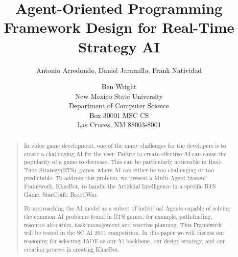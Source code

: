 \documentclass[letterpaper]{article}
\begin{document}
%
\title{Agent-Oriented Programming Framework Design for Real-Time Strategy AI}

\author{Antonio Arredondo, Daniel Jaramillo, Frank Natividad \and Ben Wright\\
New Mexico State University \\ Department of Computer Science \\ Box 30001 MSC CS \\ Las Cruces, NM 88003-8001
}



\maketitle
\begin{abstract}
\begin{quote}
In video game development, one of the many challenges for the developers is to create a challenging AI for the user.  Failure to create effective AI can cause the popularity of a game to decrease.  This can be particularly noticeable in Real-Time Strategy(RTS) games, where AI can either be too challenging or too predictable.  To address this problem, we present a Multi-Agent System Framework, KhasBot, to handle the Artificial Intelligence in a specific RTS Game, StarCraft: BroodWar. 

 By approaching the AI model as a subset of individual Agents capable of solving the common AI problems found in RTS games, for example, path-finding, resource allocation, task management and reactive planning.  This Framework will be tested in the SC AI 2011 competition.  In this paper we will discuss our reasoning for selecting JADE as our AI backbone, our design strategy, and our creation process in creating KhasBot.
\end{quote}
\end{abstract}
\end{document}
